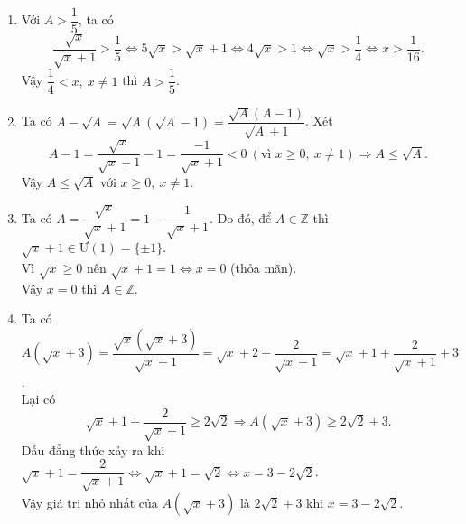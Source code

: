 \begin{bt}
{\begin{enumerate}
			\item Với $ A>\dfrac{1}{5} $, ta có 
			\[
			\dfrac{\sqrt{x}}{\sqrt{x}+1}>\dfrac{1}{5}\Leftrightarrow 5\sqrt{x}>\sqrt{x}+1\Leftrightarrow 4\sqrt{x}>1\Leftrightarrow \sqrt{x}>\dfrac{1}{4}\Leftrightarrow x>\dfrac{1}{16}.
			\]
			Vậy $ \dfrac{1}{4}<x,\ x\neq 1 $ thì $ A>\dfrac{1}{5} $.
			\item Ta có $ A-\sqrt{A}=\sqrt{A}(\sqrt{A}-1)=\dfrac{\sqrt{A}(A-1)}{\sqrt{A}+1} $. Xét 
			\[ 
			A-1=\dfrac{\sqrt{x}}{\sqrt{x}+1}-1=\dfrac{-1}{\sqrt{x}+1}<0\ (\text{vì }x\geq 0,\ x\neq 1)\Rightarrow A\leq \sqrt{A}.
			\]
			Vậy $ A\leq \sqrt{A} $ với $ x\geq 0,\ x\neq 1 $.
			\item Ta có $ A=\dfrac{\sqrt{x}}{\sqrt{x}+1}=1-\dfrac{1}{\sqrt{x}+1} $. Do đó, để $ A\in \mathbb{Z} $ thì $ \sqrt{x}+1\in\text{Ư}(1)=\{\pm 1\} $.\\
			Vì $ \sqrt{x}\geq 0 $ nên $ \sqrt{x}+1=1\Leftrightarrow x=0 $ (thỏa mãn).\\
			Vậy $ x=0 $ thì $ A\in\mathbb{Z} $.
			\item Ta có $ A(\sqrt{x}+3)=\dfrac{\sqrt{x}(\sqrt{x}+3)}{\sqrt{x}+1}=\sqrt{x}+2+\dfrac{2}{\sqrt{x}+1}=\sqrt{x}+1+\dfrac{2}{\sqrt{x}+1}+3 $.\\
			Lại có
			\[ 
			\sqrt{x}+1+\dfrac{2}{\sqrt{x}+1}\geq 2\sqrt{2}\Rightarrow A(\sqrt{x}+3)\geq 2\sqrt{2}+3.
			\]
			Dấu đẳng thức xảy ra khi $ \sqrt{x}+1=\dfrac{2}{\sqrt{x}+1}\Leftrightarrow \sqrt{x}+1=\sqrt{2}\Leftrightarrow x=3-2\sqrt{2} $.\\
			Vậy giá trị nhỏ nhất của $ A(\sqrt{x}+3) $ là $ 2\sqrt{2}+3 $ khi $ x=3-2\sqrt{2} $.
		\end{enumerate}
	}
\end{bt}
